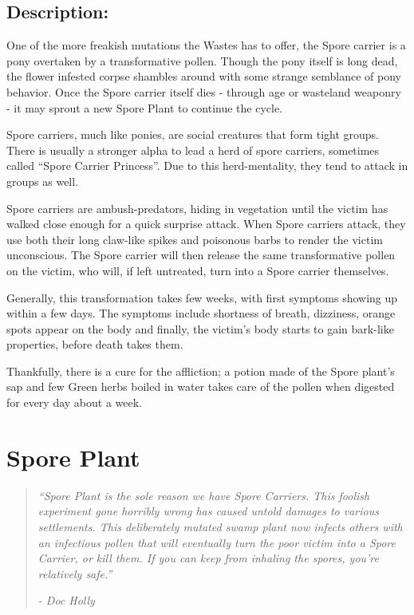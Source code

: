 \documentclass[11pt,a4paper,twocolumn]{book}
\begin{document}
	\subsection*{Description:}
	One of the more freakish mutations the Wastes has to offer, the Spore carrier is a pony overtaken by a transformative pollen. Though the pony itself is long dead, the flower infested corpse shambles around with some strange semblance of pony behavior. Once the Spore carrier itself dies - through age or wasteland weaponry - it may sprout a new Spore Plant to continue the cycle.
	
	Spore carriers, much like ponies, are social creatures that form tight groups. There is usually a stronger alpha to lead a herd of spore carriers, sometimes called ``Spore Carrier Princess''. Due to this herd-mentality, they tend to attack in groups as well.
	
	Spore carriers are ambush-predators, hiding in vegetation until the victim has walked close enough for a quick surprise attack. When Spore carriers attack, they use both their long claw-like spikes and poisonous barbs to render the victim unconscious. The Spore carrier will then release the same transformative pollen on the victim, who will, if left untreated, turn into a Spore carrier themselves. 
	
	Generally, this transformation takes few weeks, with first symptoms showing up within a few days. The symptoms include shortness of breath, dizziness, orange spots appear on the body and finally, the victim's body starts to gain bark-like properties, before death takes them. 
	
	Thankfully, there is a cure for the affliction; a potion made of the Spore plant's sap and few Green herbs boiled in water takes care of the pollen when digested for every day about a week. 
	
	\clearpage
	
	\section*{Spore Plant}
	\begin{quote}
		\emph{``Spore Plant is the sole reason we have Spore Carriers. This foolish experiment gone horribly wrong has caused untold damages to various settlements. This deliberately mutated swamp plant now infects others with an infectious pollen that will eventually turn the poor victim into a Spore Carrier, or kill them. If you can keep from inhaling the spores, you're relatively safe.''}
		
		\emph{-	Doc Holly}
	\end{quote}
	
\end{document}
